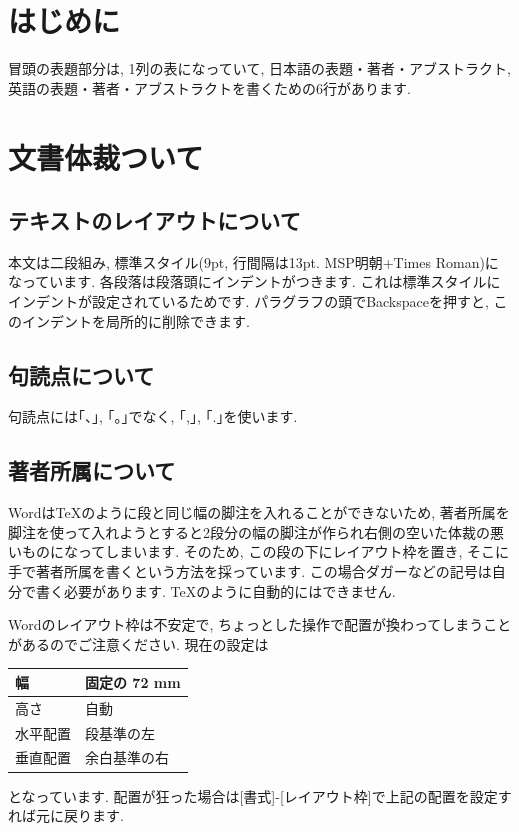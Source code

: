 \documentclass[a4paper,9pt]{extarticle}
\begin{document}
\maketitle

\begin{multicols}{2}

\section{はじめに}
冒頭の表題部分は, 1列の表になっていて, 日本語の表題・著者・アブストラクト, 英語の表題・著者・アブストラクトを書くための6行があります. 

\section{文書体裁ついて}

\subsection{テキストのレイアウトについて}
本文は二段組み, 標準スタイル(9pt, 行間隔は13pt. MSP明朝+Times Roman)になっています.  
各段落は段落頭にインデントがつきます. これは標準スタイルにインデントが設定されているためです. パラグラフの頭でBackspaceを押すと, このインデントを局所的に削除できます. 

\subsection{句読点について}
句読点には｢、｣, ｢。｣でなく, ｢,｣, ｢.｣を使います. 

\subsection{著者所属について}
WordはTeXのように段と同じ幅の脚注を入れることができないため, 著者所属を脚注を使って入れようとすると2段分の幅の脚注が作られ右側の空いた体裁の悪いものになってしまいます. そのため, この段の下にレイアウト枠を置き, そこに手で著者所属を書くという方法を採っています. この場合ダガーなどの記号は自分で書く必要があります. TeXのように自動的にはできません. 

Wordのレイアウト枠は不安定で,  ちょっとした操作で配置が換わってしまうことがあるのでご注意ください. 現在の設定は

\noindent
\begin{tabularx}{\linewidth}{|X|X|}
    \hline
    幅 & 固定の 72 mm \\
    \hline
    高さ & 自動 \\
    \hline
    水平配置 & 段基準の左 \\
    \hline
    垂直配置 & 余白基準の右 \\
    \hline
\end{tabularx}
となっています. 配置が狂った場合は[書式]-[レイアウト枠]で上記の配置を設定すれば元に戻ります. 


\end{multicols}
\end{document}
